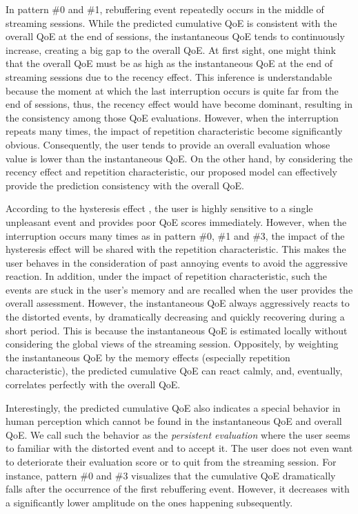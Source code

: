   In pattern \#0 and \#1, rebuffering event repeatedly occurs in the middle of streaming sessions. While the predicted cumulative QoE is consistent with the overall QoE at the end of sessions, the instantaneous QoE tends to continuously increase, creating a big gap to the overall QoE. At first sight, one might think that the overall QoE must be as high as the instantaneous QoE at the end of streaming sessions due to the recency effect. This inference is understandable because the moment at which the last interruption occurs is quite far from the end of sessions, thus, the recency effect would have become dominant, resulting in the consistency among those QoE evaluations. However, when the interruption repeats many times, the impact of repetition characteristic become significantly obvious. Consequently, the user tends to provide an overall evaluation whose value is lower than the instantaneous QoE. On the other hand, by considering the recency effect and repetition characteristic, our proposed model can effectively provide the prediction consistency with the overall QoE.
  
  According to the hysteresis effect \cite{TemporalHysteresisModel}, the user is highly sensitive to a single unpleasant event and provides poor QoE scores immediately. However, when the interruption occurs many times as in pattern \#0, \#1 and \#3, the impact of the hysteresis effect will be shared with the repetition characteristic. This makes the user behaves in the consideration of past annoying events to avoid the aggressive reaction. In addition, under the impact of repetition characteristic, such the events are stuck in the user's memory and are recalled when the user provides the overall assessment. However, the instantaneous QoE always aggressively reacts to the distorted events, by dramatically decreasing and quickly recovering during a short period. This is because the instantaneous QoE is estimated locally without considering the global views of the streaming session. Oppositely, by weighting the instantaneous QoE by the memory effects (especially repetition characteristic), the predicted cumulative QoE can react calmly, and, eventually, correlates perfectly with the overall QoE. 
  
  Interestingly, the predicted cumulative QoE also indicates a special behavior in human perception which cannot be found in the instantaneous QoE and overall QoE. We call such the behavior as the \textit{persistent evaluation} where the user seems to familiar with the distorted event and to accept it. The user does not even want to deteriorate their evaluation score or to quit from the streaming session. For instance, pattern \#0 and \#3 visualizes that the cumulative QoE dramatically falls after the occurrence of the first rebuffering event. However, it decreases with a significantly lower amplitude on the ones happening subsequently.

